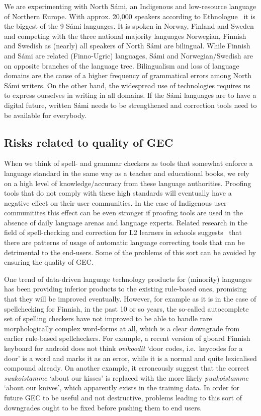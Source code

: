 \documentclass[free]{flammie}
\begin{document}
We are experimenting with North Sámi, an Indigenous and low-resource language of
Northern Europe. With approx. 20,000 speakers according to
Ethnologue~\cite{ethnologue} it is the biggest of the 9 Sámi languages. It is
spoken in Norway, Finland and Sweden and competing with the three national
majority languages Norwegian, Finnish and Swedish as (nearly) all speakers of
North Sámi are bilingual.  While Finnish and Sámi are related (Finno-Ugric)
languages, Sámi and Norwegian/Swedish are on opposite branches of the language
tree. Bilingualism and loss of language domains are the cause of a higher
frequency of grammatical errors among North Sámi writers. On the other hand, the
widespread use of technologies requires us to express ourselves in writing in
all domains. If the Sámi languages are to have a digital future, written Sámi
needs to be strengthened and correction tools need to be available for
everybody.


\subsection{Risks related to quality of GEC}

When we think of spell- and grammar checkers as tools that somewhat enforce a
language standard in the same way as a teacher and educational books, we rely on
a high level of knowledge/accuracy from these language authorities. Proofing
tools that do not comply with these high standards will eventually have a
negative effect on their user communities. In the case of Indigenous user
communitites this effect can be even stronger if proofing tools are used in the
absence of daily language arenas and language experts.  Related research in the
field of spell-checking and correction for L2 learners in schools
suggests~\cite{hogstrom2024not} that there are patterns of usage of automatic
language correcting tools that can be detrimental to the end-users.  Some of the
problems of this sort can be avoided by ensuring the quality of GEC.\


One trend of data-driven language technology products for (minority) languages
has been providing inferior products to the existing rule-based ones, promising
that they will be improved eventually. However, for example as it is in the case
of spellchecking for Finnish, in the past 10 or so years, the so-called
autocomplete set of spelling checkers have not improved to be able to handle
rare morphologically complex word-forms at all, which is a clear downgrade from
earlier rule-based spellcheckers. For example, a recent version of gboard
Finnish keyboard for android does not think \textit{ovikoodit} `door codes,
i.e.\ keycodes for a door' is a word and marks it as an error, while it is a
normal and quite lexicalised compound already. On another example, it
erroneously suggest that the correct \textit{suukoistamme} `about our kisses' is
replaced with the more likely \textit{puukoistamme} `about our knives', which
apparently exists in the training data.  In order for future GEC to be useful
and not destructive, problems leading to this sort of downgrades ought to be
fixed before pushing them to end users.
\end{document}
